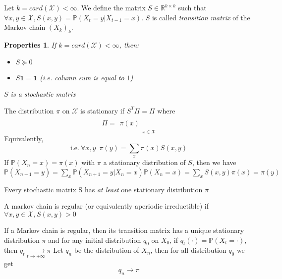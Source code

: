 \documentclass[12pt]{report}
\newcommand{\p}{\mathbb{P}}
\newcommand{\R}{\mathbb{R}}
\newtheorem{properties}{Properties}[section]
\begin{document}
\begin{definition}
  Let $k = card(\mathcal{X}) < \infty$. We define the matrix $S \in \R^{k\times k}$ such that $\forall x,y \in \mathcal{X}, S(x,y)=\p(X_t=y|X_{t-1}=x)$. $S$ is called \emph{transition matrix} of the Markov chain $(X_k)_{k}$.
\end{definition}
  
\begin{properties}
  If $k = card(\mathcal{X}) < \infty$, then:
  \begin{itemize}
    \item $S \succeq 0$
    \item $S \mathbf{1} = \mathbf{1}$ (i.e. column sum is equal to $1$)
  \end{itemize}
  $S$ is a stochastic matrix
\end{properties}

\begin{definition}
The distribution $\pi$ on $\mathcal{X}$ is stationary if $S^T\Pi = \Pi$ where 
$$ \Pi = \begin{matrix}
  ~ \\
  \pi(x) \\
  ~
 \end{matrix}_{x \in \mathcal{X}}$$
Equivalently,
$$\text{i.e.}\ \forall x, y\,\,\, \pi(y) = \sum_x \pi(x)S(x, y)$$
If $\p(X_{n} = x) = \pi(x)$ with $\pi$ a stationary distribution of $S$, then we have
$\p(X_{n + 1} = y) = \sum_x \p(X_{n+1}  = y | X_n = x)\p(X_n = x) = \sum_x S(x, y)\pi(x) = \pi(y)$
\end{definition}

\begin{theorem}
Every stochastic matrix S has \emph{at least} one stationary distribution $\pi$
\end{theorem}

\begin{definition}
  A markov chain is regular (or equivalently aperiodic irreductible) if $\forall x,y \in \mathcal{X}, S(x,y) > 0$
\end{definition}

\begin{proposition}
If a Markov chain is regular, then its transition matrix has a unique stationary distribution $\pi$ and for any initial distribution $q_0$ on $X_0$, if $q_t(\cdot) = \p(X_t = \cdot)$, then $q_t \underset{t\rightarrow + \infty}{\longrightarrow} \pi$
Let $q_n$ be the distribution of $X_n$, then for all distribution $q_0$ we get $$q_n \rightarrow \pi$$
\end{proposition}
\end{document}
